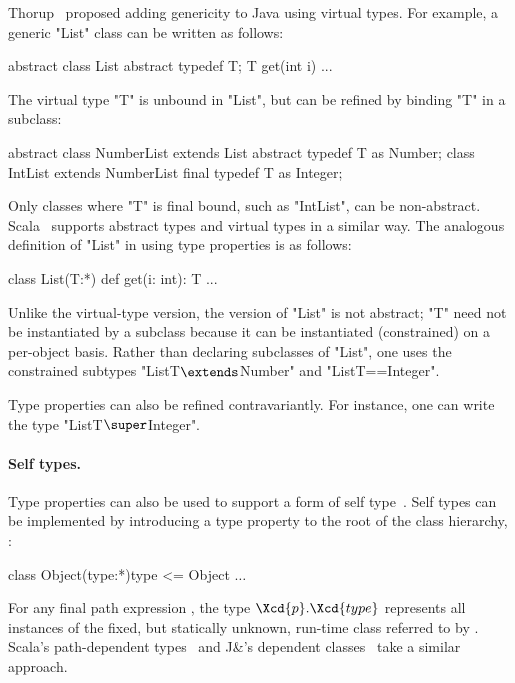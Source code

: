 Thorup~\cite{thorup97}
proposed adding genericity to Java using virtual types.  For example,
a generic \xcd"List" class can be written as follows:
{
\begin{xten}
abstract class List {
  abstract typedef T;
  T get(int i) { ... }
}
\end{xten}}
\noindent
The virtual type \xcd"T" is unbound in \xcd"List", but 
can be refined by binding \xcd"T" in a subclass:
{
\begin{xten}
abstract class NumberList extends List {
  abstract typedef T as Number;
}
class IntList extends NumberList {
  final typedef T as Integer;
}
\end{xten}}
\noindent
Only classes where \xcd"T" is final bound, such as \xcd"IntList",
can be non-abstract.  Scala~\cite{scala} supports abstract types
and virtual types in a similar way.
%
The analogous definition of 
\xcd"List" in \Xten{} using type properties is as follows:
{
\begin{xten}
class List(T:*) {
  def get(i: int): T { ... }
}
\end{xten}}

\noindent
Unlike the virtual-type version,
the \Xten{} version of \xcd"List" is not abstract;
\xcd"T" need not be instantiated by a subclass because it can be
instantiated (constrained) on a per-object basis.
Rather than declaring subclasses of \xcd"List",
one uses the constrained subtypes
\xcdmath"List{T$\extends$Number}" and \xcd"List{T==Integer}".

Type properties can also be refined contravariantly.
For instance, one can write the type \xcdmath"List{T$\super$Integer}".

\paragraph{Self types.}

Type properties can also be used to support a form of self
type~\cite{bruce-binary,bsg95}.
%
Self types can be implemented by introducing a
type property  to the root of the class hierarchy,
:
\begin{xtenmath}
class Object(type:*){type <= Object} { $\dots$ }
\end{xtenmath}

\noindent
For any final path expression , the type
$\Xcd{p}.\Xcd{type}$ represents all instances of the fixed,
but statically unknown, run-time class referred to by .
Scala's path-dependent types~\cite{scala} and J\&'s
dependent classes~\cite{nqm06}
take a similar approach.

